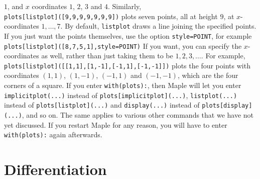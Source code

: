 \documentclass{amsart}
\begin{document}
\begin{itemize}
  $1$, and $x$ coordinates $1$, $2$, $3$ and $4$. 
  Similarly, \\
  \verb~plots[listplot]([9,9,9,9,9,9,9])~ plots
  seven points, all at height $9$, at $x$-coordinates
  $1,\dotsc,7$. 
%
  By default, \verb~listplot~ draws a line joining the
  specified points.  If you just want the points themselves,
  use the option \verb~style=POINT~, for example 
  \verb~plots[listplot]([8,7,5,1],style=POINT)~
%
  If you want, you can specify the $x$-coordinates as well,
  rather than just taking them to be $1,2,3,\dotsc$.  For
  example, \\
  \verb~plots[listplot]([[1,1],[1,-1],[-1,1],[-1,-1]])~
  plots the four points with coordinates $(1,1)$, $(1,-1)$,
  $(-1,1)$ and $(-1,-1)$, which are the four corners of a
  square. 
%
  If you enter \verb~with(plots):~, then Maple will let you
  enter \verb~implicitplot(...)~ instead of
  \verb~plots[implicitplot](...)~, \verb~listplot(...)~
  instead of \verb~plots[listplot](...)~  and
  \verb~display(...)~ instead of \verb~plots[display](...)~,
  and so on.  The same applies to various other commands
  that we have not yet discussed. 
%
  If you restart Maple for any reason, you will
  have to enter \verb~with(plots):~ again afterwards. 
\end{itemize}

\section{Differentiation}\label{sec-diff}
\setcounter{notecounter}{0}
\end{document}
